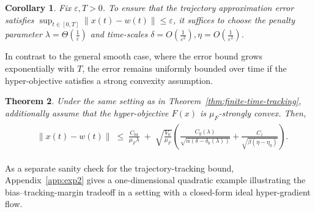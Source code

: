 \documentclass{article}
\newtheorem{theorem}{Theorem}[section]
\newtheorem{corollary}[theorem]{Corollary}
\newcommand{\1}{\mathbf{1}}
\begin{document}

\begin{corollary}\label{cor:eps-complexity}
    Fix $\varepsilon,  T>0$. To ensure that the trajectory approximation error satisfies $\sup_{t\in[0,T]}\|x(t)-w(t)\| \le \varepsilon$, it suffices to choose the penalty parameter $\lambda = \Theta\left(\frac{1}{\varepsilon}\right)$ and time-scales $\delta = O\left(\frac{1}{\varepsilon^2}\right), \eta = O\left(\frac{1}{\varepsilon^2}\right)$.
\end{corollary}

In contrast to the general smooth case, where the error bound grows exponentially with $T$, the error remains uniformly bounded over time if the hyper-objective satisfies a strong convexity assumption.


\begin{theorem}
\label{thm:uniform-tracking-sc}
    Under the same setting as in Theorem~\ref{thm:finite-time-tracking}, additionally assume that the hyper-objective $F(x)$ is $\mu_F$-strongly convex. Then, 
    \begin{align}
    \begin{aligned}
        &\|x(t)-w(t)\|
        \;\le\;
        \frac{C_{\mathrm{br}}}{\mu_F \lambda}
        \;+\;
      \sqrt{\frac{V_0}{\mu_F}} \left( \frac{C_y(\lambda)}{\sqrt{\alpha(\delta - \delta_0(\lambda))}} + \frac{C_z}{\sqrt{\beta(\eta - \eta_0)}} \right).
    \end{aligned}
    \end{align}
\end{theorem}

As a separate sanity check for the trajectory-tracking bound, Appendix~\ref{app:exp2} gives a one-dimensional quadratic example illustrating the bias--tracking-margin tradeoff in a setting with a closed-form ideal hyper-gradient flow.
\end{document}
